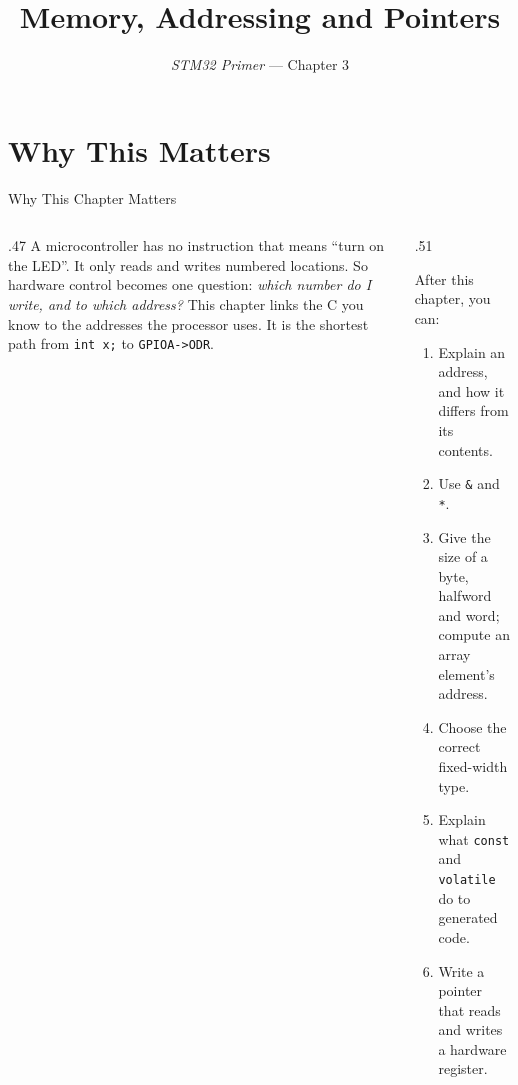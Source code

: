 \documentclass[9pt,aspectratio=169,xcolor=table]{beamer}
\title{Memory, Addressing and Pointers}
\subtitle{\emph{STM32 Primer} --- Chapter 3}
\begin{document}
\titlepage

\section{Why This Matters}

\begin{frame}{Why This Chapter Matters}
    \begin{columns}[T]
    \begin{column}{.47\textwidth}
        {\normalsize A microcontroller has no instruction that means ``turn on the LED''. It only reads and writes numbered locations. So hardware control becomes one question: \emph{which number do I write, and to which address?} This chapter links the C you know to the addresses the processor uses. It is the shortest path from \texttt{int x;} to \texttt{GPIOA->ODR}.}
    \end{column}
    \begin{column}{.51\textwidth}
        \begin{block}{After this chapter, you can:}
        {\small
        \begin{enumerate}\itemsep2pt
            \item Explain an address, and how it differs from its contents.
            \item Use \texttt{\&} and \texttt{*}.
            \item Give the size of a byte, halfword and word; compute an array element's address.
            \item Choose the correct fixed-width type.
            \item Explain what \texttt{const} and \texttt{volatile} do to generated code.
            \item Write a pointer that reads and writes a hardware register.
        \end{enumerate}}
        \end{block}
    \end{column}
    \end{columns}
\end{frame}
\end{document}
